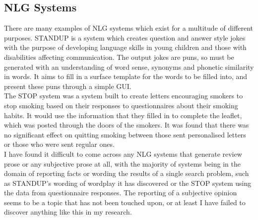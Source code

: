 \subsection{NLG Systems}
There are many examples of NLG systems which exist for a multitude of different purposes.
STANDUP is a system which creates question and answer style jokes with the purpose of developing language skills in young children and those with disabilities affecting communication. The output jokes are puns, so must be generated with an understanding of word sense, synonyms and phonetic similarity in words. It aims to fill in a surface template for the words to be filled into, and present these puns through a simple GUI.\\

The STOP system was a system built to create letters encouraging smokers to stop smoking based on their responses to questionnaires about their smoking habits. It would use the information that they filled in to complete the leaflet, which was posted through the doors of the smokers. It was found that there was no significant effect on quitting smoking between those sent personalised letters or those who were sent regular ones.\\

I have found it difficult to come across any NLG systems that generate review prose or any subjective prose at all, with the majority of systems being in the domain of reporting facts or wording the results of a single search problem, such as STANDUP's wording of wordplay it has discovered or the STOP system using the data from questionnaire responses. The reporting of a subjective opinion seems to be a topic that has not been touched upon, or at least I have failed to discover anything like this in my research.

